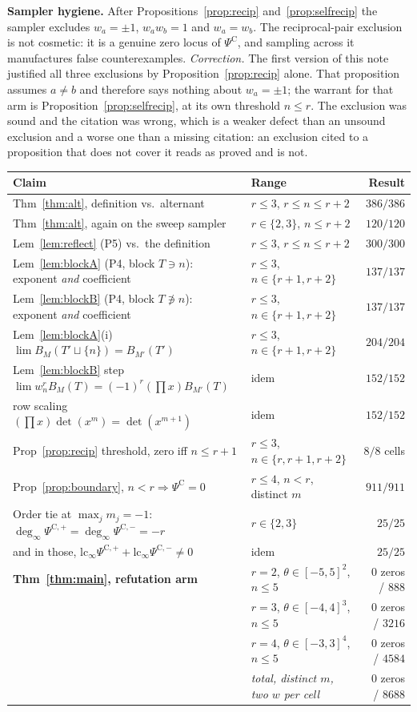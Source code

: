 \documentclass[11pt]{article}
\theoremstyle{definition}
\newcommand{\PsiC}{\Psi^{\mathrm{C}}}
\newcommand{\PsiCs}[1]{\Psi^{\mathrm{C},#1}}
\newcommand{\degi}{\deg_{\infty}}
\begin{document}
\medskip
\noindent\textbf{Sampler hygiene.} After Propositions~\ref{prop:recip}
and~\ref{prop:selfrecip} the sampler excludes $w_a=\pm1$, $w_aw_b=1$ and $w_a=w_b$. The
reciprocal-pair exclusion is not cosmetic: it is a genuine zero locus of $\PsiC$, and
sampling across it manufactures false counterexamples. \emph{Correction.} The first
version of this note justified all three exclusions by Proposition~\ref{prop:recip} alone.
That proposition assumes $a\ne b$ and therefore says nothing about $w_a=\pm1$; the warrant
for that arm is Proposition~\ref{prop:selfrecip}, at its own threshold $n\le r$. The
exclusion was sound and the citation was wrong, which is a weaker defect than an unsound
exclusion and a worse one than a missing citation: an exclusion cited to a proposition
that does not cover it reads as proved and is not.

\begin{center}
\begin{tabular}{llr}
\hline
\textbf{Claim} & \textbf{Range} & \textbf{Result}\\
\hline
Thm~\ref{thm:alt}, definition vs.\ alternant & $r\le3$, $r\le n\le r+2$ & $386/386$\\
Thm~\ref{thm:alt}, again on the sweep sampler & $r\in\{2,3\}$, $n\le r+2$ & $120/120$\\
Lem~\ref{lem:reflect} (P5) vs.\ the definition & $r\le3$, $r\le n\le r+2$ & $300/300$\\
Lem~\ref{lem:blockA} (P4, block $T\ni n$): exponent \emph{and} coefficient & $r\le3$, $n\in\{r{+}1,r{+}2\}$ & $137/137$\\
Lem~\ref{lem:blockB} (P4, block $T\not\ni n$): exponent \emph{and} coefficient & $r\le3$, $n\in\{r{+}1,r{+}2\}$ & $137/137$\\
Lem~\ref{lem:blockA}(i) $\lim B_M(T'\sqcup\{n\})=B_{M'}(T')$ & $r\le3$, $n\in\{r{+}1,r{+}2\}$ & $204/204$\\
Lem~\ref{lem:blockB} step $\lim w_n^rB_M(T)=(-1)^r(\prod x)B_{M'}(T)$ & idem & $152/152$\\
row scaling $(\prod x)\det(x^m)=\det(x^{m+1})$ & idem & $152/152$\\
Prop~\ref{prop:recip} threshold, zero iff $n\le r+1$ & $r\le3$, $n\in\{r,r{+}1,r{+}2\}$ & $8/8$ cells\\
Prop~\ref{prop:boundary}, $n<r\Rightarrow\PsiC=0$ & $r\le4$, $n<r$, distinct $m$ & $911/911$\\
Order tie at $\max_jm_j=-1$: $\degi\PsiCs{+}=\degi\PsiCs{-}=-r$ & $r\in\{2,3\}$ & $25/25$\\
\quad and in those, $\mathrm{lc}_\infty\PsiCs{+}+\mathrm{lc}_\infty\PsiCs{-}\ne0$ & idem & $25/25$\\
\hline
\textbf{Thm~\ref{thm:main}, refutation arm} & $r{=}2$, $\theta\in[-5,5]^2$, $n\le5$ & $0$ zeros / $888$\\
 & $r{=}3$, $\theta\in[-4,4]^3$, $n\le5$ & $0$ zeros / $3216$\\
 & $r{=}4$, $\theta\in[-3,3]^4$, $n\le5$ & $0$ zeros / $4584$\\
 & \emph{total, distinct $m$, two $w$ per cell} & $0$ zeros / $8688$\\
\hline
\end{tabular}
\end{center}
\end{document}
